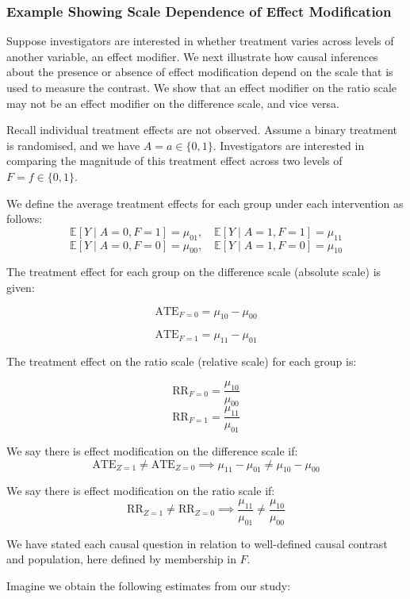 \documentclass[
  single column]{article}
\begin{document}
\subsubsection{Example Showing Scale Dependence of Effect
Modification}\label{example-showing-scale-dependence-of-effect-modification}

Suppose investigators are interested in whether treatment varies across
levels of another variable, an effect modifier. We next illustrate how
causal inferences about the presence or absence of effect modification
depend on the scale that is used to measure the contrast. We show that
an effect modifier on the ratio scale may not be an effect modifier on
the difference scale, and vice versa.

Recall individual treatment effects are not observed. Assume a binary
treatment is randomised, and we have \(A = a \in \{0,1\}\).
Investigators are interested in comparing the magnitude of this
treatment effect across two levels of \(F = f \in \{0,1\}\).

We define the average treatment effects for each group under each
intervention as follows: \[
\mathbb{E}[Y \mid A = 0, F = 1] = \mu_{01}, \quad \mathbb{E}[Y \mid  A = 1, F = 1] = \mu_{11}
\] \[
\mathbb{E}[Y \mid  A = 0, F = 0] = \mu_{00}, \quad \mathbb{E}[Y \mid A = 1, F = 0] = \mu_{10}
\]

The treatment effect for each group on the difference scale (absolute
scale) is given:

\[
\text{ATE}_{F = 0} = \mu_{10} - \mu_{00}
\]

\[
\text{ATE}_{F = 1} = \mu_{11} - \mu_{01}
\]

The treatment effect on the ratio scale (relative scale) for each group
is:

\[
\text{RR}_{F = 0} = \frac{\mu_{10}}{\mu_{00}}
\] \[
\text{RR}_{F = 1} = \frac{\mu_{11}}{\mu_{01}}
\]

We say there is effect modification on the difference scale if: \[
\text{ATE}_{Z = 1} \neq \text{ATE}_{Z = 0} \implies \mu_{11} - \mu_{01} \neq \mu_{10} - \mu_{00}
\]

We say there is effect modification on the ratio scale if: \[
\text{RR}_{Z = 1} \neq \text{RR}_{Z = 0} \implies \frac{\mu_{11}}{\mu_{01}} \neq \frac{\mu_{10}}{\mu_{00}}
\]

We have stated each causal question in relation to well-defined causal
contrast and population, here defined by membership in \(F\).

Imagine we obtain the following estimates from our study:
\end{document}
